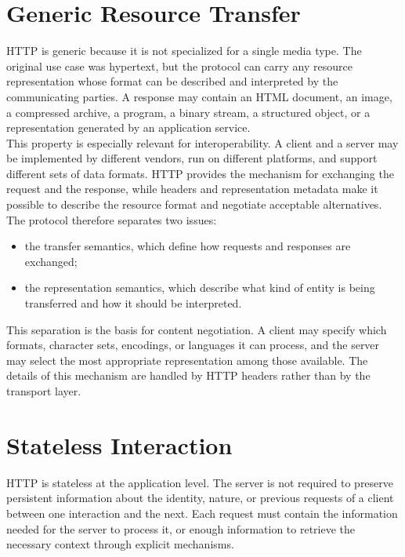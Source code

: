 \documentclass{scrbook}
\begin{document}
\section{Generic Resource Transfer}

HTTP is generic because it is not specialized for a single media type. The original use case was hypertext, but the protocol can carry any resource representation whose format can be described and interpreted by the communicating parties. A response may contain an HTML document, an image, a compressed archive, a program, a binary stream, a structured object, or a representation generated by an application service.\\

This property is especially relevant for interoperability. A client and a server may be implemented by different vendors, run on different platforms, and support different sets of data formats. HTTP provides the mechanism for exchanging the request and the response, while headers and representation metadata make it possible to describe the resource format and negotiate acceptable alternatives.\\

The protocol therefore separates two issues:
\begin{itemize}
    \item the transfer semantics, which define how requests and responses are exchanged;
    \item the representation semantics, which describe what kind of entity is being transferred and how it should be interpreted.
\end{itemize}

This separation is the basis for content negotiation. A client may specify which formats, character sets, encodings, or languages it can process, and the server may select the most appropriate representation among those available. The details of this mechanism are handled by HTTP headers rather than by the transport layer.

\section{Stateless Interaction}

HTTP is stateless at the application level. The server is not required to preserve persistent information about the identity, nature, or previous requests of a client between one interaction and the next. Each request must contain the information needed for the server to process it, or enough information to retrieve the necessary context through explicit mechanisms.\\
\end{document}
